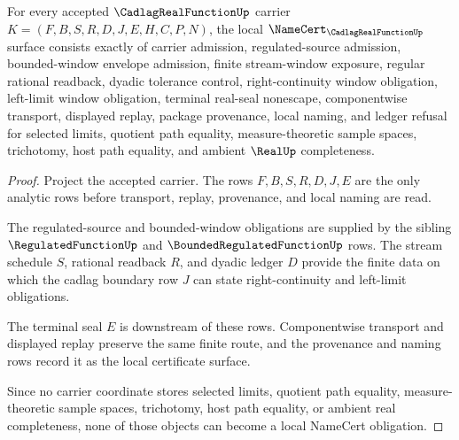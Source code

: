 \begin{theorem}
\label{thm:cadlag-real-function-namecert-obligations}
For every accepted $\CadlagRealFunctionUp$ carrier $K=(F,B,S,R,D,J,E,H,C,P,N)$, the local $\NameCert_{\CadlagRealFunctionUp}$ surface consists exactly of carrier admission, regulated-source admission, bounded-window envelope admission, finite stream-window exposure, regular rational readback, dyadic tolerance control, right-continuity window obligation, left-limit window obligation, terminal real-seal nonescape, componentwise transport, displayed replay, package provenance, local naming, and ledger refusal for selected limits, quotient path equality, measure-theoretic sample spaces, trichotomy, host path equality, and ambient $\RealUp$ completeness.
\end{theorem}
\begin{proof}
Project the accepted carrier. The rows $F,B,S,R,D,J,E$ are the only analytic rows before transport, replay, provenance, and local naming are read.

The regulated-source and bounded-window obligations are supplied by the sibling $\RegulatedFunctionUp$ and $\BoundedRegulatedFunctionUp$ rows. The stream schedule $S$, rational readback $R$, and dyadic ledger $D$ provide the finite data on which the cadlag boundary row $J$ can state right-continuity and left-limit obligations.

The terminal seal $E$ is downstream of these rows. Componentwise transport and displayed replay preserve the same finite route, and the provenance and naming rows record it as the local certificate surface.

Since no carrier coordinate stores selected limits, quotient path equality, measure-theoretic sample spaces, trichotomy, host path equality, or ambient real completeness, none of those objects can become a local NameCert obligation.
\end{proof}

